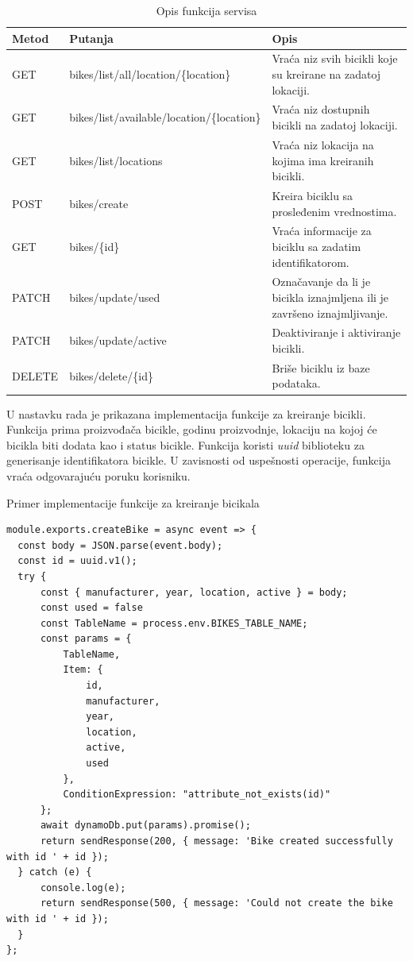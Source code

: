 \documentclass[12pt,oneside]{memoir}
\begin{document}
\begin{table}
  \centering
  \caption{Opis funkcija servisa}
  \label{tbl:funkcije}
  \begin{tabular}{|p{2cm}|p{7cm}|p{4cm}|} %
    \hline
      Metod& Putanja & Opis \\
    \hline
    GET & bikes/list/all/location/\{location\} & Vraća niz svih bicikli koje su kreirane na zadatoj lokaciji.\\
    \hline
    GET & bikes/list/available/location/\{location\} & Vraća niz dostupnih bicikli na zadatoj lokaciji.\\
    \hline
    GET & bikes/list/locations & Vraća niz lokacija na kojima ima kreiranih bicikli.\\
    \hline
    POST & bikes/create & Kreira biciklu sa prosleđenim vrednostima.\\
    \hline
    GET & bikes/\{id\} & Vraća informacije za biciklu sa zadatim identifikatorom.\\
    \hline
    PATCH & bikes/update/used & Označavanje da li je bicikla iznajmljena ili je završeno iznajmljivanje.\\
    \hline
    PATCH & bikes/update/active & Deaktiviranje i aktiviranje bicikli. \\
    \hline
    DELETE & bikes/delete/\{id\} & Briše biciklu iz baze podataka.\\
    \hline
  \end{tabular}
\end{table}

U nastavku rada je prikazana implementacija funkcije za kreiranje bicikli. Funkcija prima proizvođača bicikle, godinu proizvodnje, lokaciju na kojoj će bicikla biti dodata kao i status bicikle. Funkcija koristi \emph{uuid} biblioteku za generisanje identifikatora bicikle. U zavisnosti od uspešnosti operacije, funkcija vraća odgovarajuću poruku korisniku.

\begin{center}Primer implementacije funkcije za kreiranje bicikala\end{center}
\begin{lstlisting}
module.exports.createBike = async event => {
  const body = JSON.parse(event.body);
  const id = uuid.v1();
  try {
      const { manufacturer, year, location, active } = body;
      const used = false
      const TableName = process.env.BIKES_TABLE_NAME;
      const params = {
          TableName,
          Item: {
              id,
              manufacturer,
              year,
              location,
              active,
              used
          },
          ConditionExpression: "attribute_not_exists(id)"
      };
      await dynamoDb.put(params).promise();
      return sendResponse(200, { message: 'Bike created successfully with id ' + id });
  } catch (e) {
      console.log(e);
      return sendResponse(500, { message: 'Could not create the bike with id ' + id });
  }
};
\end{lstlisting}
\end{document}
